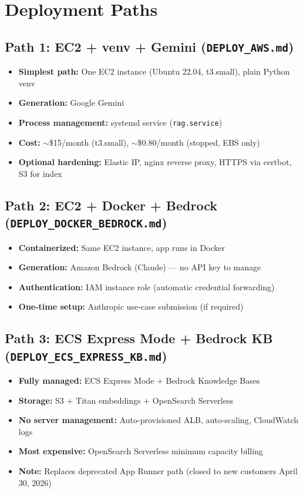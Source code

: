 \documentclass[11pt,a4paper]{paper}
\begin{document}
\section{Deployment Paths}
\label{sec:deployment}

\subsection{Path 1: EC2 + venv + Gemini (\texttt{DEPLOY\_AWS.md})}

\begin{itemize}
  \item \textbf{Simplest path:} One EC2 instance (Ubuntu 22.04, t3.small), plain Python venv
  \item \textbf{Generation:} Google Gemini
  \item \textbf{Process management:} systemd service (\texttt{rag.service})
  \item \textbf{Cost:} $\sim$\$15/month (t3.small), $\sim$\$0.80/month (stopped, EBS only)
  \item \textbf{Optional hardening:} Elastic IP, nginx reverse proxy, HTTPS via certbot, S3 for index
\end{itemize}

\subsection{Path 2: EC2 + Docker + Bedrock (\texttt{DEPLOY\_DOCKER\_BEDROCK.md})}

\begin{itemize}
  \item \textbf{Containerized:} Same EC2 instance, app runs in Docker
  \item \textbf{Generation:} Amazon Bedrock (Claude) — no API key to manage
  \item \textbf{Authentication:} IAM instance role (automatic credential forwarding)
  \item \textbf{One-time setup:} Anthropic use-case submission (if required)
\end{itemize}

\subsection{Path 3: ECS Express Mode + Bedrock KB (\texttt{DEPLOY\_ECS\_EXPRESS\_KB.md})}

\begin{itemize}
  \item \textbf{Fully managed:} ECS Express Mode + Bedrock Knowledge Bases
  \item \textbf{Storage:} S3 + Titan embeddings + OpenSearch Serverless
  \item \textbf{No server management:} Auto-provisioned ALB, auto-scaling, CloudWatch logs
  \item \textbf{Most expensive:} OpenSearch Serverless minimum capacity billing
  \item \textbf{Note:} Replaces deprecated App Runner path (closed to new customers April 30, 2026)
\end{itemize}
\end{document}
